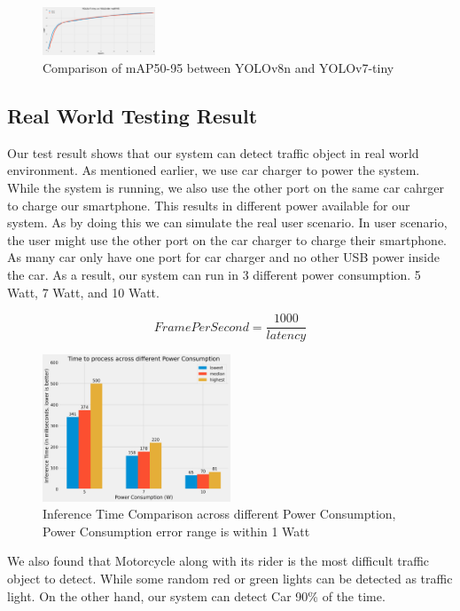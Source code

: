 \documentclass[conference]{IEEEtran}
\begin{document}
\begin{figure}[h!]
\centering
\includegraphics[width=0.3\textwidth,keepaspectratio]{YOLOv7-tinyvsYOLOv8n.png}
\caption{Comparison of mAP50-95 between YOLOv8n and YOLOv7-tiny}
\label{fig:mAP_comparison}
\end{figure}



\subsection{Real World Testing Result}
Our test result shows that our system can detect traffic object in real world environment.
As mentioned earlier, we use car charger to power the system. While the system is running, we also use the other port on the same car cahrger to charge our smartphone. This results in different power available for our system.
As by doing this we can simulate the real user scenario. In user scenario, the user might use the other port on the car charger to charge their smartphone. As many car only have one port for car charger and no other USB power inside the car.
As a result, our system can run in 3 different power consumption. 5 Watt, 7 Watt, and 10 Watt.

\begin{equation}\label{FPS}
    Frame Per Second = \frac{1000}{latency}
\end{equation}

\begin{figure}[h!]
\centering
\includegraphics[width=0.5\textwidth,keepaspectratio]{inference_time_comparison.png}
\caption{Inference Time Comparison across different Power Consumption, Power Consumption error range is within 1 Watt}
\label{fig:inference_time_comparison}
\end{figure}
We also found that Motorcycle along with its rider is the most difficult traffic object to detect. While some random red or green lights can be detected as traffic light.
On the other hand, our system can detect Car 90\% of the time.
\end{document}
